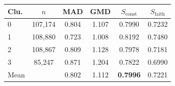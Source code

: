 \setlength{\tabcolsep}{3.5pt}
\begin{tabular}{lccccc}
\toprule
Clu. & $n$ & MAD & GMD & $S_{\mathrm{const}}$ & $S_{\mathrm{faith}}$\\
\midrule
0 & 107,174 & 0.804 & 1.107 & 0.7990 & 0.7232\\
1 & 108,880 & 0.723 & 1.008 & 0.8192 & 0.7480\\
2 & 108,867 & 0.809 & 1.128 & 0.7978 & 0.7181\\
3 & 85,247 & 0.871 & 1.204 & 0.7822 & 0.6990\\
\midrule
Mean & & 0.802 & 1.112 & \textbf{0.7996} & 0.7221\\
\bottomrule
\end{tabular}